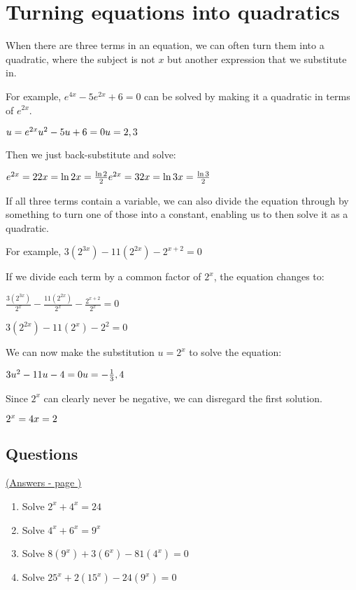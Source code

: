\documentclass[../main.tex]{subfiles}
\begin{document}
\section{Turning equations into quadratics}
When there are three terms in an equation, we can often turn them into a quadratic, where the subject is not \(x\) but another expression that we substitute in.

For example, \(e^{4x}-5e^{2x}+6=0\) can be solved by making it a quadratic in terms of \(e^{2x}\).

\(u=e^{2x}\\
u^2-5u+6=0\\
u=2, 3\)

Then we just back-substitute and solve:

\(
e^{2x}=2     \\      
2x=\ln{2}      \\ 
x=\frac{\ln{2}}{2}\\     
e^{2x}=3\\
2x=\ln{3}\\
x=\frac{\ln{3}}{2}
\)

If all three terms contain a variable, we can also divide the equation through by something to turn one of those into a constant, enabling us to then solve it as a quadratic.

For example, \(3(2^{3x})-11(2^{2x})-2^{x+2}=0\)

If we divide each term by a common factor of \(2^x\), the equation changes to:

\(\frac{3(2^{3x})}{2^x}-\frac{11(2^{2x})}{2^x}-\frac{2^{x+2}}{2^x}=0\)

\(3(2^{2x})-11(2^x)-2^2=0\)

We can now make the substitution \(u=2^x\) to solve the equation:

\(3u^2-11u-4=0\\
u=-\frac{1}{3}, 4\)

Since \(2^x\) can clearly never be negative, we can disregard the first solution.

\(2^x=4\\
x=2\)\\

\pagebreak
\hypertarget{quadraticslink}{\subsection*{Questions}}
\hyperlink{quadraticsanswers}{(Answers - page {\pageref*{Quadratics answers}})}

\label{quadratics}
\begin{enumerate}
    \item Solve \(2^x+4^x=24\)
    
    \item Solve \(4^x+6^x=9^x\)
    
    \item Solve \(8(9^x)+3(6^x)-81(4^x)=0\)
    
    \item Solve \(25^x+2(15^x)-24(9^x)=0\)
\end{enumerate}
\end{document}
